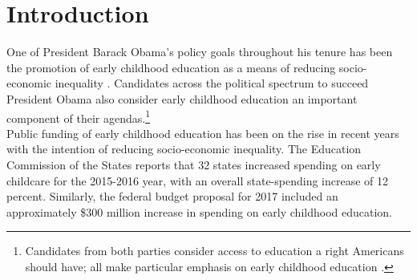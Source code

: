 \singlespacing
\tableofcontents
\listoffigures
\listoftables

\section{Introduction}

\noindent One of President Barack Obama's policy goals throughout his tenure has been the promotion of early childhood education as a means of reducing socio-economic inequality \citep{Bajaj_Labaton_2009_ObamaRiskAssets,White_House_2014_Econ_of_EC_Investments,White_House_2014_Fact_Sheet_Press}. Candidates across the political spectrum to succeed President Obama also consider early childhood education an important component of their agendas.\footnote{Candidates from both parties consider access to education a right Americans should have; all make particular emphasis on early childhood education \citep{Hillary-for-Am_2016_Universal-Preschool,On-the-Issues_2016_Sanders-on-Families,On-the-Issues_2016_Cruz-on-Education}.}\\ 

\noindent Public funding of early childhood education has been on the rise in recent years with the intention of reducing socio-economic inequality. The Education Commission of the States reports that 32 states increased spending on early childcare for the 2015-2016 year, with an overall state-spending increase of 12 percent. Similarly, the federal budget proposal for 2017 included an approximately \$300 million increase in spending on early childhood education.\\

